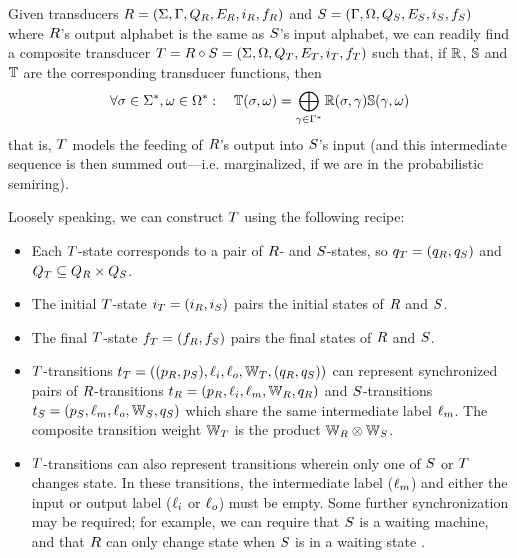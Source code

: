 \documentclass[english]{article}
\begin{document}
Given transducers
 $R = (\Sigma, \Gamma, Q_{R}, E_{R}, i_{R}, f_{R})$ and
 $S = (\Gamma, \Omega, Q_{S}, E_{S}, i_{S}, f_{S})$
where $R$'s output alphabet is the same as $S$'s input alphabet,
we can readily find a composite transducer
 $T = R \circ S = (\Sigma, \Omega, Q_{T}, E_{T}, i_{T}, f_{T})$
such that, if $\mathbb{R}$, $\mathbb{S}$ and $\mathbb{T}$ are the corresponding transducer functions,
then
\[
\forall \sigma \in {\Sigma}^{\ast}, \omega \in {\Omega}^{\ast}:
\quad
\mathbb{T}(\sigma,\omega) = \bigoplus_{\gamma \in {\Gamma}^{\ast}} \mathbb{R}(\sigma,\gamma) \mathbb{S}(\gamma,\omega)
\]
that is, $T$ models the feeding of $R$'s output into $S$'s input
(and this intermediate sequence is then summed out---i.e. marginalized, if we are in the probabilistic semiring).

Loosely speaking, we can construct $T$ using the following recipe:
\begin{itemize}
\item Each $T$-state corresponds to a pair of $R$- and $S$-states,
so $q_{T} = (q_{R}, q_{S})$
and $Q_{T} \subseteq Q_{R} \times Q_{S}$.
\item The initial $T$-state $i_{T}=(i_{R},i_{S})$ pairs the initial states of $R$ and $S$.
\item The final $T$-state $f_{T}=(f_{R},f_{S})$ pairs the final states of $R$ and $S$.
\item $T$-transitions
$t_{T} = ((p_{R},p_{S}),\ell_i,\ell_o,\mathbb{W}_{T},(q_{R},q_{S}))$
can represent synchronized pairs of $R$-transitions
$t_{R} = (p_{R},\ell_i,\ell_m,\mathbb{W}_{R},q_{R})$
and $S$-transitions
$t_{S} = (p_{S},\ell_m,\ell_o,\mathbb{W}_{S},q_{S})$
which share the same intermediate label $\ell_m$.
The composite transition weight $\mathbb{W}_{T}$ is the product $\mathbb{W}_{R} \otimes \mathbb{W}_{S}$.
\item $T$-transitions can also represent transitions wherein only one of $S$ or $T$ changes state.
In these transitions, the intermediate label ($\ell_m$) and either the input or output label ($\ell_i$ or $\ell_o$)
must be empty.
Some further synchronization may be required; for example, we can require that $S$ is a waiting machine,
and that $R$ can only change state when $S$ is in a waiting state \cite{WestessonEtAlArxiv2012}.
\end{itemize}
\end{document}
